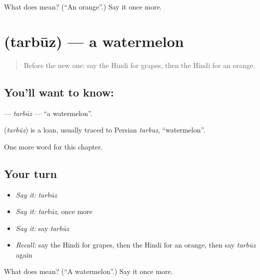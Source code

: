 \begin{tcolorbox}[breakable,colback=teal!4,colframe=teal!35!black,title={Before you move on}]
What does  mean? (\textquotedblleft{}An orange\textquotedblright{}.) Say it once more.
\end{tcolorbox}
\section[\texorpdfstring{\hi{तरबूज़} (tarbūz)}{तरबूज़ (tarbūz)}]{ (tarbūz) — a watermelon}

\label{lesson:HI-C140-tarbuz}



\begin{quote}
Before the new one: say the Hindi for grapes, then the Hindi for an orange.
\end{quote}

\subsection*{You'll want to know: }
\textbf{} — \emph{tarbūz} — \textquotedblleft{}a watermelon\textquotedblright{}.

\begin{cousinweb}
\textbf{} (\emph{tarbūz}) is a loan, usually traced to Persian \emph{tarbuz}, \textquotedblleft{}watermelon\textquotedblright{}.
\end{cousinweb}

\begin{grammarlens}[title={What you've built}]
One more word for this chapter.
\end{grammarlens}

\subsection*{Your turn}
\begin{itemize}
\raggedright
  \item \emph{Say it:} \emph{tarbūz}
  \item \emph{Say it:} \emph{tarbūz}, once more
  \item \emph{Say it:} say \emph{tarbūz}
  \item \emph{Recall:} say the Hindi for grapes, then the Hindi for an orange, then say \emph{tarbūz} again
\end{itemize}

\begin{tcolorbox}[breakable,colback=teal!4,colframe=teal!35!black,title={Before you move on}]
What does  mean? (\textquotedblleft{}A watermelon\textquotedblright{}.) Say it once more.
\end{tcolorbox}
